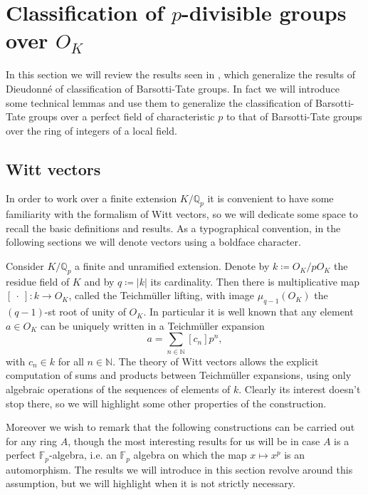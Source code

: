 \section{Classification of \texorpdfstring{$p$}{p}-divisible groups
	over \texorpdfstring{$O_{ K }$}{the ring of integers of K}}
In this section we will review the results seen in \cite[Appendix A]{Kisin},
which generalize the results of Dieudonné of classification of Barsotti-Tate groups.
In fact we will introduce some technical lemmas and use them to
generalize the classification of Barsotti-Tate groups over a perfect field
of characteristic $p$
to that of Barsotti-Tate groups over the ring of integers of a local field.



\subsection{Witt vectors}
In order to work over a finite extension $K/\mathbb{Q}_p$ it is convenient to
have some familiarity with the formalism of Witt vectors, so we will dedicate some 
space to recall the basic definitions and results.
As a typographical convention, in the following sections we will
denote vectors using a boldface character.


\begin{rem}[Motivation]
	Consider $K/\mathbb{Q}_p$ a finite and unramified extension.
	Denote by $k \coloneqq O_K/pO_K$ the residue field of $K$ and by $q \coloneqq \left| k \right|$
	its cardinality.
	Then there is multiplicative map $[\ \cdot \ ]\colon k \to O_K$,
	called the Teichmüller lifting, with image $\mu_{q-1}(O_K)$
	the $(q-1)$-st root of unity of $O_K$.
	In particular it is well known that any element $a \in O_K$
	can be uniquely written in a Teichmüller expansion
	\begin{equation*}
		a = \sum_{n \in \mathbb{N}} [c_n] p^n
	,\end{equation*}
	with $c_n \in k$ for all $n \in \mathbb{N}$.
	The theory of Witt vectors allows the explicit computation of sums and
	products between Teichmüller expansions, using only
	algebraic operations of the sequences of elements of $k$.
	Clearly its interest doesn't stop there, so we will highlight some 
	other properties of the construction.

	Moreover we wish to remark that the following constructions
	can be carried out for any ring $A$, though the most interesting
	results for us will be in case $A$ is a perfect $\mathbb{F}_p$-algebra,
	i.e. an $\mathbb{F}_p$ algebra on which the map $x \mapsto x^p$
	is an automorphism.
	The results we will introduce in this section
	revolve around this assumption, but we will highlight when
	it is not strictly necessary.
\end{rem}


